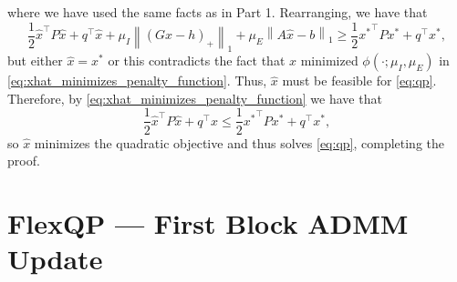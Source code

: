 \documentclass{article} %
\newcommand{\norm}[1]{\left\lVert#1\right\rVert}
\begin{document}
where we have used the same facts as in Part 1.
Rearranging, we have that
\begin{equation}
    \frac{1}{2} \hat{x}^\top P \hat{x} + q^\top \hat{x} + \mu_I \norm{(G\hat{x} - h)_+}_1 + \mu_E \norm{A\hat{x} - b}_1 \geq \frac{1}{2} {x^*}^\top P x^* + q^\top x^*,
\end{equation}
but either $\hat{x} = x^*$ or this contradicts the fact that $\hat{x}$ minimized $\phi(\cdot; \mu_I, \mu_E)$ in \cref{eq:xhat_minimizes_penalty_function}. Thus, $\hat{x}$ must be feasible for \cref{eq:qp}.
Therefore, by \cref{eq:xhat_minimizes_penalty_function} we have that
\begin{equation}
    \frac{1}{2} \hat{x}^\top P \hat{x} + q^\top \hat{x} \leq \frac{1}{2} {x^*}^\top P x^* + q^\top x^*,
\end{equation}
so $\hat{x}$ minimizes the quadratic objective and thus solves \cref{eq:qp}, completing the proof.


\section{FlexQP --- First Block ADMM Update}
\label{appendix:eq_constrained_qp}
\end{document}
